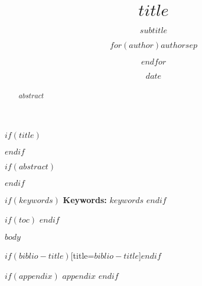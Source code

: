 \documentclass[$if(fontsize)$$fontsize$,$endif$$if(lang)$$babel-lang$,$endif$$if(papersize)$$papersize$,$endif$,12pt,twoside]{article}
\title{\Large\bfseries $title$}
\subtitle{$subtitle$}
\author{$for(author)$$author$$sep$ \and $endfor$}
\date{$date$}
\begin{document}
$if(title)$
\maketitle
$endif$

$if(abstract)$
\begin{abstract}
$abstract$
\end{abstract}
$endif$

$if(keywords)$
\noindent\textbf{Keywords:} $keywords$
\vspace{1.5em}
$endif$

$if(toc)$
\tableofcontents
\vspace{2em}
$endif$

$body$

\printbibliography$if(biblio-title)$[title=$biblio-title$]$endif$

$if(appendix)$
\appendix
$appendix$
$endif$
\end{document}
